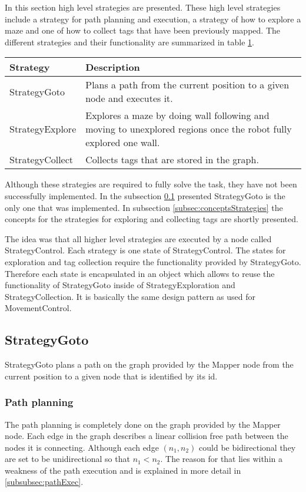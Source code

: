 In this section high level strategies are presented. These high level strategies include a strategy for path planning and execution, a strategy of
how to explore a maze and one of how to collect tags that have been previously mapped. The different strategies and their functionality are summarized in table \ref{table:strategies}.

\begin{table}[h]
\label{table:strategies}
\center
  \begin{tabular}{l|p{10cm}}
    \textbf{Strategy} & \textbf{Description} \\ \hline
    StrategyGoto & Plans a path from the current position to a given node and executes it.  \\ \hline
    StrategyExplore & Explores a maze by doing wall following and moving to unexplored regions once the robot fully explored one wall. \\ \hline
    StrategyCollect & Collects tags that are stored in the graph. \\
    \hline
  \end{tabular}
\end{table}

Although these strategies are required to fully solve the task, they have not been successfully implemented. In the subsection \ref{subsec:goto} presented StrategyGoto is the only one that was implemented. In subsection \ref{subsec:conceptsStrategies} the concepts for the strategies for exploring and collecting tags are shortly presented.

The idea was that all higher level strategies are executed by a node called StrategyControl. Each strategy is one state of StrategyControl. 
The states for exploration and tag collection require the functionality provided by StrategyGoto. Therefore each state is encapsulated in an object which allows to reuse the functionality of StrategyGoto inside of StrategyExploration and StrategyCollection. It is basically the same design pattern as used for MovementControl.

\subsection{StrategyGoto}
\label{subsec:goto}
StrategyGoto plans a path on the graph provided by the Mapper node from the current position to a given node that is identified by its id.
\subsubsection{Path planning}
\label{pathplanning}
The path planning is completely done on the graph provided by the Mapper node. Each edge in the graph describes a linear collision free path between the nodes it is connecting. Although each edge $(n_1,n_2)$ could be bidirectional they are set to be unidirectional so that $n_1 < n_2$. The reason for that lies within a weakness of the path execution and is explained in more detail in \ref{subsubsec:pathExec}. 

